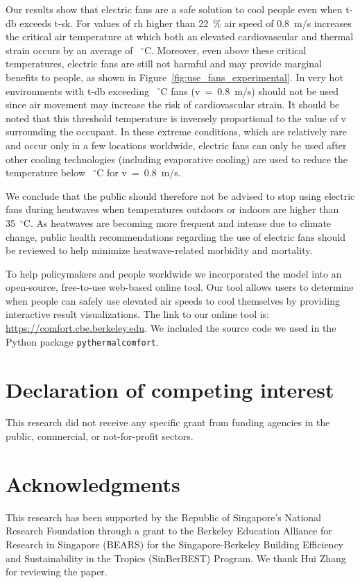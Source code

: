 Our results show that electric fans are a safe solution to cool people even when \ac{t-db} exceeds \ac{t-sk}.
For values of \ac{rh} higher than 22~\% air speed of 0.8~m/s increases the critical air temperature at which both an elevated cardiovascular and thermal strain occurs by an average of ~$^{\circ}$C\@.
Moreover, even above these critical temperatures, electric fans are still not harmful and may provide marginal benefits to people, as shown in Figure~\ref{fig:use_fans_experimental}.
In very hot environments with \ac{t-db} exceeding ~$^{\circ}$C fans (\acf{v}~=~0.8~m/s) should not be used since air movement may increase the risk of cardiovascular strain.
It should be noted that this threshold temperature is inversely proportional to the value of \ac{v} surrounding the occupant.
In these extreme conditions, which are relatively rare and occur only in a few locations worldwide, electric fans can only be used after other cooling technologies (including evaporative cooling) are used to reduce the temperature below ~$^{\circ}$C for \ac{v}~=~0.8~m/s.

We conclude that the public should therefore not be advised to stop using electric fans during heatwaves when temperatures outdoors or indoors are higher than 35~$^{\circ}$C\@.
As heatwaves are becoming more frequent and intense due to climate change, public health recommendations regarding the use of electric fans should be reviewed to help minimize heatwave-related morbidity and mortality.

To help policymakers and people worldwide we incorporated the model into an open-source, free-to-use web-based online tool.
Our tool allows users to determine when people can safely use elevated air speeds to cool themselves by providing interactive result visualizations.
The link to our online tool is: \url{https://comfort.cbe.berkeley.edu}.
We included the source code we used in the Python package \verb|pythermalcomfort|.

\section{Declaration of competing interest}\label{sec:declaration-of-competing-interest}
This research did not receive any specific grant from funding agencies in the public, commercial, or not-for-profit sectors.

\section{Acknowledgments}\label{sec:acknowledgments}
This research has been supported by the Republic of Singapore's National Research Foundation through a grant to the Berkeley Education Alliance for Research in Singapore (BEARS) for the Singapore-Berkeley Building Efficiency and Sustainability in the Tropics (SinBerBEST) Program.
We thank Hui Zhang for reviewing the paper.